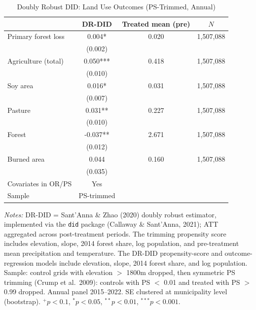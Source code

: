 \begin{table}[htbp]
\centering
\small
\caption{Doubly Robust DID: Land Use Outcomes (PS-Trimmed, Annual)}
\label{tab:did_drdid_landuse}
\begin{tabular}{lccc}
\toprule
 & DR-DID & Treated mean (pre) & $N$ \\
\midrule
Primary forest loss & 0.004* & 0.020 & 1,507,088 \\
 & (0.002) & & \\
[0.5em]
Agriculture (total) & 0.050*** & 0.418 & 1,507,088 \\
 & (0.010) & & \\
[0.5em]
Soy area & 0.016* & 0.031 & 1,507,088 \\
 & (0.007) & & \\
[0.5em]
Pasture & 0.031** & 0.227 & 1,507,088 \\
 & (0.010) & & \\
[0.5em]
Forest & -0.037** & 2.671 & 1,507,088 \\
 & (0.012) & & \\
[0.5em]
Burned area & 0.044 & 0.160 & 1,507,088 \\
 & (0.035) & & \\
\midrule
Covariates in OR/PS & Yes & & \\
Sample & PS-trimmed & & \\
\bottomrule
\end{tabular}
\begin{tablenotes}[flushleft]
\small
\item \textit{Notes:} DR-DID = Sant'Anna \& Zhao (2020) doubly robust estimator, implemented via the \texttt{did} package (Callaway \& Sant'Anna, 2021); ATT aggregated across post-treatment periods. The trimming propensity score includes elevation, slope, 2014 forest share, log population, and pre-treatment mean precipitation and temperature. The DR-DID propensity-score and outcome-regression models include elevation, slope, 2014 forest share, and log population. Sample: control grids with elevation $>$ 1800m dropped, then symmetric PS trimming (Crump et al.\ 2009): controls with PS $<$ 0.01 and treated with PS $>$ 0.99 dropped. Annual panel 2015--2022. SE clustered at municipality level (bootstrap). $^{+}p<0.1$, $^{*}p<0.05$, $^{**}p<0.01$, $^{***}p<0.001$.
\end{tablenotes}
\end{table}
